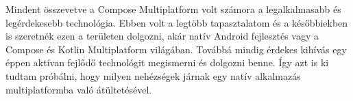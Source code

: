 Mindent összevetve a Compose Multiplatform volt számora a legalkalmasabb és legérdekesebb technológia.
Ebben volt a legtöbb tapasztalatom és a későbbiekben is szeretnék ezen a területen dolgozni, akár natív Android fejlesztés vagy a Compose és Kotlin Multiplatform világában.
Továbbá mindig érdekes kihívás egy éppen aktívan fejlődő technológit megismerni és dolgozni benne.
Így azt is ki tudtam próbálni, hogy milyen nehézségek járnak egy natív alkalmazás multiplatformba való átültetésével.
